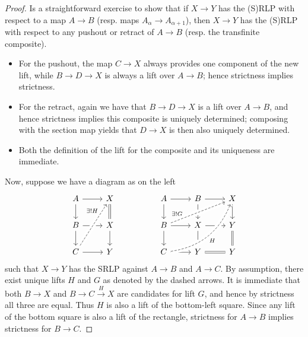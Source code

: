 \documentclass[a4paper,10p,draft]{article}%
\numberwithin{equation}{section}%
\begin{document}
\begin{proof}
      Is a straightforward exercise to show that
      if $X \to Y$ has the (S)RLP with respect to a map $A \to B$ (resp. maps $A_\alpha \to A_{\alpha +1}$), then
      $X \to Y$ has the (S)RLP with respect to any pushout or retract of $A \to B$ (resp. the transfinite composite).
      \begin{itemize}
      \item For the pushout, the map $C \to X$ always provides one component of the new lift,
            while $B \to D \to X$ is always a lift over $A \to B$; hence strictness implies strictness.
      \item For the retract, again we have that $B \to D \to X$ is a lift over $A \to B$,
            and hence strictness implies this composite is uniquely determined;
            composing with the section map yields that $D \to X$ is then also uniquely determined.
      \item Both the definition of the lift for the composite and its uniqueness are immediate.
      \end{itemize}
      Now, suppose we have a diagram as on the left
      \begin{equation}
            \begin{tikzcd}
                  A \arrow[r] \arrow[d]
                  &
                  X \arrow[d, equal]
                  &&
                  A \arrow[r] \arrow[d]
                  &
                  B \arrow[d] \arrow[r]
                  &
                  X \arrow[d]
                  \\
                  B \arrow[r] \arrow[d]
                  &
                  X \arrow[d]
                  &&
                  B \arrow[r] \arrow[d] \arrow[urr, crossing over, near start, dashed, "\exists ! G"]
                  &
                  X \arrow[r] \arrow[d]
                  &
                  Y \arrow[d, equal]
                  \\
                  C \arrow[r] \arrow[uur, dashed, crossing over, near end, "\exists ! H"]
                  &
                  Y
                  &&
                  C \arrow[r] \arrow[uurr, bend right, crossing over, dashed, "H"']
                  &
                  Y \arrow[r, equal]
                  &
                  Y
            \end{tikzcd}
      \end{equation}
      such that $X \to Y$ has the SRLP against $A \to B$ and $A \to C$.
      By assumption, there exist unique lifts $H$ and $G$ as denoted by the dashed arrows.
      It is immediate that both $B \to X$ and $B \to C \xrightarrow{H} X$ are candidates for lift $G$,
      and hence by strictness all three are equal.
      Thus $H$ is also a lift of the bottom-left square.
      Since any lift of the bottom square is also a lift of the rectangle,
      strictness for $A \to B$ implies strictness for $B \to C$.
\end{proof}
\end{document}
